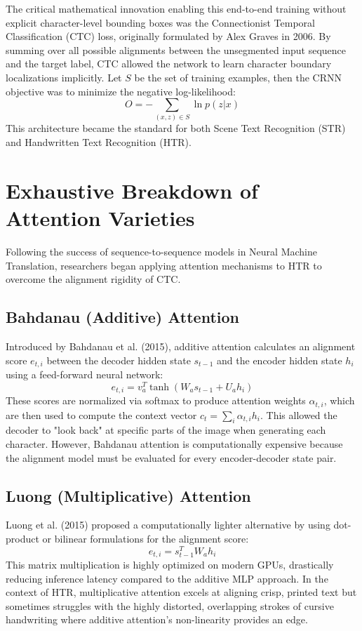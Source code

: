The critical mathematical innovation enabling this end-to-end training without explicit character-level bounding boxes was the Connectionist Temporal Classification (CTC) loss, originally formulated by Alex Graves in 2006. By summing over all possible alignments between the unsegmented input sequence and the target label, CTC allowed the network to learn character boundary localizations implicitly. Let $S$ be the set of training examples, then the CRNN objective was to minimize the negative log-likelihood:
\begin{equation}
    O = - \sum_{(x, z) \in S} \ln p(z | x)
\end{equation}
This architecture became the standard for both Scene Text Recognition (STR) and Handwritten Text Recognition (HTR).

\section{Exhaustive Breakdown of Attention Varieties}
Following the success of sequence-to-sequence models in Neural Machine Translation, researchers began applying attention mechanisms to HTR to overcome the alignment rigidity of CTC.

\subsection{Bahdanau (Additive) Attention}
Introduced by Bahdanau et al. (2015), additive attention calculates an alignment score $e_{t,i}$ between the decoder hidden state $s_{t-1}$ and the encoder hidden state $h_i$ using a feed-forward neural network:
\begin{equation}
    e_{t,i} = v_a^T \tanh(W_a s_{t-1} + U_a h_i)
\end{equation}
These scores are normalized via softmax to produce attention weights $\alpha_{t,i}$, which are then used to compute the context vector $c_t = \sum_i \alpha_{t,i} h_i$. This allowed the decoder to "look back" at specific parts of the image when generating each character. However, Bahdanau attention is computationally expensive because the alignment model must be evaluated for every encoder-decoder state pair.

\subsection{Luong (Multiplicative) Attention}
Luong et al. (2015) proposed a computationally lighter alternative by using dot-product or bilinear formulations for the alignment score:
\begin{equation}
    e_{t,i} = s_{t-1}^T W_a h_i
\end{equation}
This matrix multiplication is highly optimized on modern GPUs, drastically reducing inference latency compared to the additive MLP approach. In the context of HTR, multiplicative attention excels at aligning crisp, printed text but sometimes struggles with the highly distorted, overlapping strokes of cursive handwriting where additive attention's non-linearity provides an edge.


